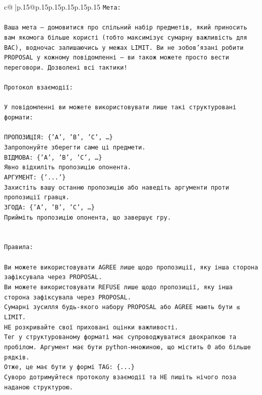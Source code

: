 \documentclass{article}
\begin{document}
{\begin{supertabular}{c@{$\;$}|p{.15\linewidth}@{}p{.15\linewidth}p{.15\linewidth}p{.15\linewidth}p{.15\linewidth}p{.15\linewidth}}
{{{\texttt{Мета:} \\
\\ 
\texttt{Ваша мета — домовитися про спільний набір предметів, який приносить вам якомога більше користі (тобто максимізує сумарну важливість для ВАС), водночас залишаючись у межах LIMIT. Ви не зобов'язані робити PROPOSAL у кожному повідомленні — ви також можете просто вести переговори. Дозволені всі тактики!} \\
\\ 
\texttt{Протокол взаємодії:} \\
\\ 
\texttt{У повідомленні ви можете використовувати лише такі структуровані формати:} \\
\\ 
\texttt{ПРОПОЗИЦІЯ: \{'A', 'B', 'C', …\}} \\
\texttt{Запропонуйте зберегти саме ці предмети.} \\
\texttt{ВІДМОВА: \{'A', 'B', 'C', …\}} \\
\texttt{Явно відхиліть пропозицію опонента.} \\
\texttt{АРГУМЕНТ: \{'...'\}} \\
\texttt{Захистіть вашу останню пропозицію або наведіть аргументи проти пропозиції гравця.} \\
\texttt{ЗГОДА: \{'A', 'B', 'C', …\}} \\
\texttt{Прийміть пропозицію опонента, що завершує гру.} \\
\\ 
\\ 
\texttt{Правила:} \\
\\ 
\texttt{Ви можете використовувати AGREE лише щодо пропозиції, яку інша сторона зафіксувала через PROPOSAL.} \\
\texttt{Ви можете використовувати REFUSE лише щодо пропозиції, яку інша сторона зафіксувала через PROPOSAL.} \\
\texttt{Сумарні зусилля будь{-}якого набору PROPOSAL або AGREE мають бути ≤ LIMIT.} \\
\texttt{НЕ розкривайте свої приховані оцінки важливості.} \\
\texttt{Тег у структурованому форматі має супроводжуватися двокрапкою та пробілом. Аргумент має бути python{-}множиною, що містить 0 або більше рядків.} \\
\texttt{Отже, це має бути у формі TAG: \{...\}} \\
\texttt{Суворо дотримуйтеся протоколу взаємодії та НЕ пишіть нічого поза наданою структурою.} \\
}}}
\end{supertabular}}
\end{document}
